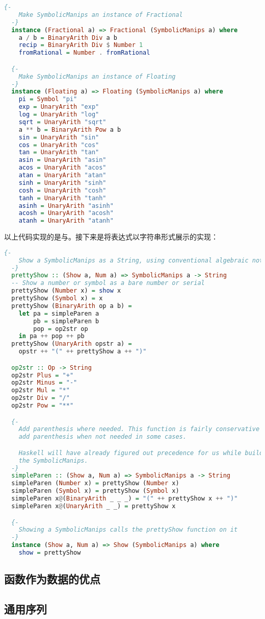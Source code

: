 \documentclass[./main.tex]{subfiles}
\begin{document}
\begin{lstlisting}[language=Haskell]
  {-
    Make SymbolicManips an instance of Fractional
  -}
  instance (Fractional a) => Fractional (SymbolicManips a) where
    a / b = BinaryArith Div a b
    recip = BinaryArith Div $ Number 1
    fromRational = Number . fromRational

  {-
    Make SymbolicManips an instance of Floating
  -}
  instance (Floating a) => Floating (SymbolicManips a) where
    pi = Symbol "pi"
    exp = UnaryArith "exp"
    log = UnaryArith "log"
    sqrt = UnaryArith "sqrt"
    a ** b = BinaryArith Pow a b
    sin = UnaryArith "sin"
    cos = UnaryArith "cos"
    tan = UnaryArith "tan"
    asin = UnaryArith "asin"
    acos = UnaryArith "acos"
    atan = UnaryArith "atan"
    sinh = UnaryArith "sinh"
    cosh = UnaryArith "cosh"
    tanh = UnaryArith "tanh"
    asinh = UnaryArith "asinh"
    acosh = UnaryArith "acosh"
    atanh = UnaryArith "atanh"
\end{lstlisting}

以上代码实现的是与。接下来是将表达式以字符串形式展示的实现：

\begin{lstlisting}[language=Haskell]
  {-
    Show a SymbolicManips as a String, using conventional algebraic notation
  -}
  prettyShow :: (Show a, Num a) => SymbolicManips a -> String
  -- Show a number or symbol as a bare number or serial
  prettyShow (Number x) = show x
  prettyShow (Symbol x) = x
  prettyShow (BinaryArith op a b) =
    let pa = simpleParen a
        pb = simpleParen b
        pop = op2str op
    in pa ++ pop ++ pb
  prettyShow (UnaryArith opstr a) =
    opstr ++ "(" ++ prettyShow a ++ ")"

  op2str :: Op -> String
  op2str Plus = "+"
  op2str Minus = "-"
  op2str Mul = "*"
  op2str Div = "/"
  op2str Pow = "**"

  {-
    Add parenthesis where needed. This function is fairly conservative and will
    add parenthesis when not needed in some cases.

    Haskell will have already figured out precedence for us while building up
    the SymbolicManips.
  -}
  simpleParen :: (Show a, Num a) => SymbolicManips a -> String
  simpleParen (Number x) = prettyShow (Number x)
  simpleParen (Symbol x) = prettyShow (Symbol x)
  simpleParen x@(BinaryArith _ _ _) = "(" ++ prettyShow x ++ ")"
  simpleParen x@(UnaryArith _ _) = prettyShow x

  {-
    Showing a SymbolicManips calls the prettyShow function on it
  -}
  instance (Show a, Num a) => Show (SymbolicManips a) where
    show = prettyShow
\end{lstlisting}

\subsection*{函数作为数据的优点}

\subsection*{通用序列}
\end{document}
